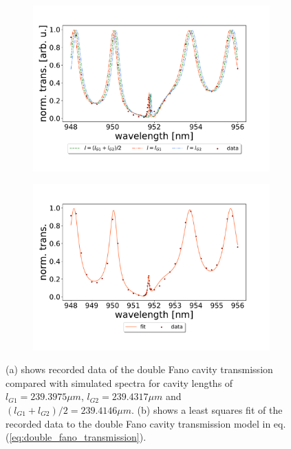 \begin{figure}[h!]
    \centering
    \begin{subfigure}[b]{0.49\textwidth}
        \centering
        \includegraphics[width=\textwidth]{figures/results/238um_long_scan_sim_comparison.pdf}
        \caption{}
        \label{fig:238um_long_scan_sim_comparison}
    \end{subfigure}
    \begin{subfigure}[b]{0.49\textwidth}
        \centering
        \includegraphics[width=\textwidth]{figures/results/238um_long_scan_fit2.pdf}
        \caption{}
        \label{fig:238um_long_scan_fit}
    \end{subfigure}
    \caption{(a) shows recorded data of the double Fano cavity transmission compared with simulated spectra for cavity lengths of $l_{G1} = 239.3975 \mu m$, $l_{G2} = 239.4317 \mu m$ and $(l_{G1} + l_{G2})/2 = 239.4146 \mu m$. (b) shows a least squares fit of the recorded data to the double Fano cavity transmission model in eq. (\ref{eq:double_fano_transmission}).}
    \label{fig:238um_cavity_fit_and_sim}
\end{figure}

